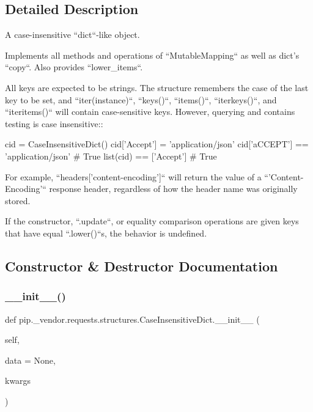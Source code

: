 \subsection{Detailed Description}
\begin{DoxyVerb}A case-insensitive ``dict``-like object.

Implements all methods and operations of
``MutableMapping`` as well as dict's ``copy``. Also
provides ``lower_items``.

All keys are expected to be strings. The structure remembers the
case of the last key to be set, and ``iter(instance)``,
``keys()``, ``items()``, ``iterkeys()``, and ``iteritems()``
will contain case-sensitive keys. However, querying and contains
testing is case insensitive::

    cid = CaseInsensitiveDict()
    cid['Accept'] = 'application/json'
    cid['aCCEPT'] == 'application/json'  # True
    list(cid) == ['Accept']  # True

For example, ``headers['content-encoding']`` will return the
value of a ``'Content-Encoding'`` response header, regardless
of how the header name was originally stored.

If the constructor, ``.update``, or equality comparison
operations are given keys that have equal ``.lower()``s, the
behavior is undefined.
\end{DoxyVerb}
 

\subsection{Constructor \& Destructor Documentation}
\mbox{\label{classpip_1_1__vendor_1_1requests_1_1structures_1_1CaseInsensitiveDict_a85bfaabcd91bb371214d628ca6ed9cf8}} 
\subsubsection{\texorpdfstring{\+\_\+\+\_\+init\+\_\+\+\_\+()}{\_\_init\_\_()}}
{\footnotesize\ttfamily def pip.\+\_\+vendor.\+requests.\+structures.\+Case\+Insensitive\+Dict.\+\_\+\+\_\+init\+\_\+\+\_\+ (\begin{DoxyParamCaption}\item[{}]{self,  }\item[{}]{data = {\ttfamily None},  }\item[{}]{kwargs }\end{DoxyParamCaption})}



